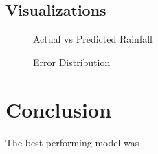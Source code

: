 \documentclass{article}
\begin{document}
\subsection{Visualizations}
\begin{figure}[h]
\centering
\caption{Actual vs Predicted Rainfall}
\end{figure}

\begin{figure}[h]
\centering
\caption{Error Distribution}
\end{figure}

\section{Conclusion}
The best performing model was %
\end{document}
